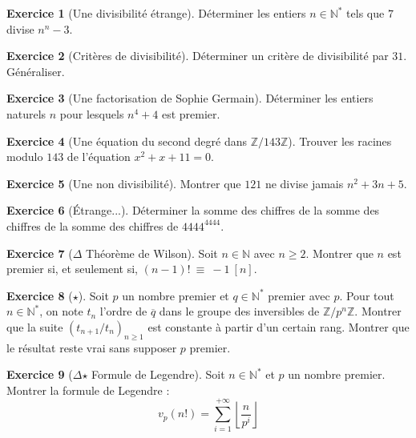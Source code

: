 \documentclass[french]{book}
\newcommand{\N}{\mathbb{N}}
\newcommand{\Z}{\mathbb{Z}}
\newcommand{\st}{^*}
\theoremstyle{definition}
\newtheorem{ex}{Exercice}[chapter]
\theoremstyle{theorem}
\theoremstyle{remark}
\begin{document}
\begin{ex}[Une divisibilité étrange]
	Déterminer les entiers $n\in\N\st$ tels que $7$ divise $n^n-3$.
\end{ex}

\begin{ex}[Critères de divisibilité]
	Déterminer un critère de divisibilité par $31$. Généraliser.
\end{ex}

\begin{ex}[Une factorisation de Sophie Germain]
	Déterminer les entiers naturels $n$ pour lesquels $n^4+4$ est premier.
\end{ex}

\begin{ex}[Une équation du second degré dans $\Z/143\Z$]
	Trouver les racines modulo $143$ de l'équation $x^2+x+11=0$.
\end{ex}

\begin{ex}[Une non divisibilité]
	Montrer que $121$ ne divise jamais $n^2+3n+5$.
\end{ex}

\begin{ex}[Étrange...]
	Déterminer la somme des chiffres de la somme des chiffres de la somme des chiffres de $4444^{4444}$.
\end{ex}

\begin{ex}[$\Delta$ Théorème de Wilson]
	Soit $n\in\N$ avec $n\geqslant 2$. Montrer que $n$ est premier si, et seulement si, $(n-1)!\ \equiv\ -1\ [n]$.
\end{ex}

\begin{ex}[$\star$]
	Soit $p$ un nombre premier et $q\in\N\st$ premier avec $p$. Pour tout $n\in\N\st$, on note $t_n$ l'ordre de $\overline{q}$ dans le groupe des inversibles de $\Z/p^n\Z$. Montrer que la suite $(t_{n+1}/t_n)_{n\geqslant 1}$ est constante à partir d'un certain rang. Montrer que le résultat reste vrai sans supposer $p$ premier.
\end{ex}

\begin{ex}[$\Delta$$\star$ Formule de Legendre]
	Soit $n\in\N\st$ et $p$ un nombre premier. Montrer la formule de Legendre : $$v_p(n!)=\sum_{i=1}^{+\infty}\left\lfloor\frac{n}{p^i}\right\rfloor$$
\end{ex}
\end{document}
